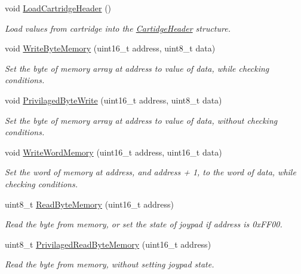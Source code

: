 \begin{DoxyCompactItemize}
void \mbox{\hyperlink{classMemory_a84956bc02c2c6ac6b0bc88de9cb6584e}{Load\+Cartridge\+Header}} ()
\begin{DoxyCompactList}\small\item\em Load values from cartridge into the \mbox{\hyperlink{structCartidgeHeader}{Cartidge\+Header}} structure. \end{DoxyCompactList}\item 
void \mbox{\hyperlink{classMemory_a82280ff8234c97746eb14dfcb60f102a}{Write\+Byte\+Memory}} (uint16\+\_\+t address, uint8\+\_\+t data)
\begin{DoxyCompactList}\small\item\em Set the byte of memory array at address to value of data, while checking conditions. \end{DoxyCompactList}\item 
void \mbox{\hyperlink{classMemory_a70a1de728fa4adac9b2da63c8434d909}{Privilaged\+Byte\+Write}} (uint16\+\_\+t address, uint8\+\_\+t data)
\begin{DoxyCompactList}\small\item\em Set the byte of memory array at address to value of data, without checking conditions. \end{DoxyCompactList}\item 
void \mbox{\hyperlink{classMemory_a64cd99f25f9224f17c0a5ee3aaba2887}{Write\+Word\+Memory}} (uint16\+\_\+t address, uint16\+\_\+t data)
\begin{DoxyCompactList}\small\item\em Set the word of memory at address, and address + 1, to the word of data, while checking conditions. \end{DoxyCompactList}\item 
uint8\+\_\+t \mbox{\hyperlink{classMemory_a2f04d90cf6d05ab12b52c1d6aef862a4}{Read\+Byte\+Memory}} (uint16\+\_\+t address)
\begin{DoxyCompactList}\small\item\em Read the byte from memory, or set the state of joypad if address is 0x\+F\+F00. \end{DoxyCompactList}\item 
uint8\+\_\+t \mbox{\hyperlink{classMemory_a564d7bb2a8fc303f95af1a02756b882e}{Privilaged\+Read\+Byte\+Memory}} (uint16\+\_\+t address)
\begin{DoxyCompactList}\small\item\em Read the byte from memory, without setting joypad state. \end{DoxyCompactList}\item 

\end{DoxyCompactItemize}
